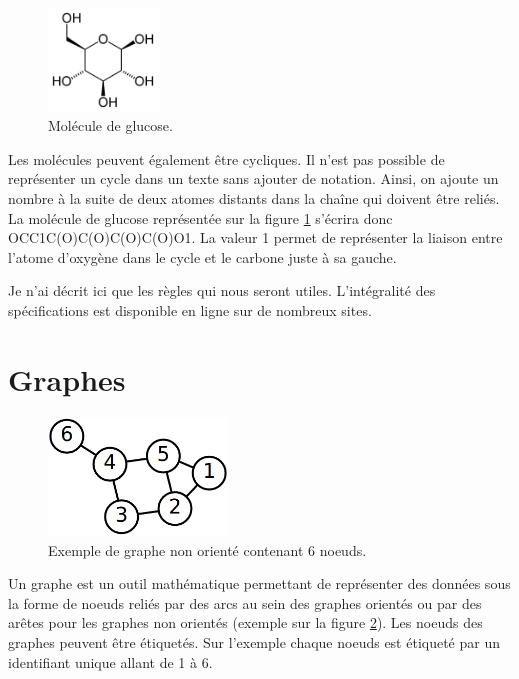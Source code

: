 \begin{figure}[h!]
  \begin{center}
    \includegraphics[width=110px]{Figures/Prerequis/glucose.png}
    \caption{\label{glucose}Molécule de glucose.}
  \end{center}
\end{figure}

Les molécules peuvent également être cycliques.
Il n'est pas possible de représenter un cycle dans un texte sans ajouter de notation.
Ainsi, on ajoute un nombre à la suite de deux atomes distants dans la chaîne qui doivent être reliés.
La molécule de glucose représentée sur la figure \ref{glucose} s'écrira donc OCC1C(O)C(O)C(O)C(O)O1.
La valeur 1 permet de représenter la liaison entre l'atome d'oxygène dans le cycle et le carbone juste à sa gauche.

Je n'ai décrit ici que les règles qui nous seront utiles.
L'intégralité des spécifications est disponible en ligne sur de nombreux sites.



\section{Graphes}

\begin{figure}[h!]
  \begin{center}
    \includegraphics[width=180px]{Figures/Prerequis/graphe.png}
    \caption{\label{graphe_def}Exemple de graphe non orienté contenant 6 noeuds.}
  \end{center}
\end{figure}

Un graphe est un outil mathématique permettant de représenter des données sous la forme de noeuds reliés par des arcs au sein des graphes orientés ou par des arêtes pour les graphes non orientés (exemple sur la figure \ref{graphe_def}).
Les noeuds des graphes peuvent être étiquetés.
Sur l'exemple chaque noeuds est étiqueté par un identifiant unique allant de 1 à 6.

